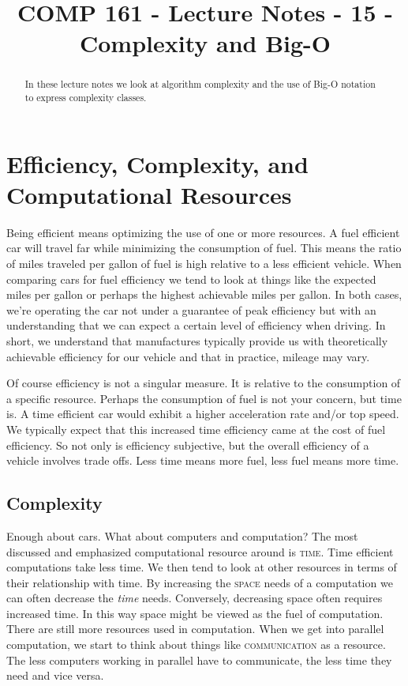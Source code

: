\documentclass[]{tufte-handout}
\title{COMP 161 - Lecture Notes - 15 - Complexity and Big-O}
\date{}
\begin{document}
 
\maketitle

\begin{abstract}
In these lecture notes we look at algorithm complexity and the use of Big-O notation to express complexity classes.
\end{abstract}

\section{Efficiency, Complexity, and Computational Resources}

Being efficient means optimizing the use of one or more resources.  A fuel efficient car will travel far while minimizing the consumption of fuel. This means the ratio of miles traveled per gallon of fuel is high relative to a less efficient vehicle.  When comparing cars for fuel efficiency we tend to look at things like the expected miles per gallon or perhaps the highest achievable miles per gallon. In both cases, we're operating the car not under a guarantee of peak efficiency but with an understanding that we can expect a certain level of efficiency when driving. In short, we understand that manufactures typically provide us with theoretically achievable efficiency for our vehicle and that in practice, mileage may vary. 

Of course efficiency is not a singular measure. It is relative to the consumption of a specific resource.  Perhaps the consumption of fuel is not your concern, but time is.  A time efficient car would exhibit a higher acceleration rate and/or top speed.  We typically expect that this increased time efficiency came at the cost of fuel efficiency. So not only is efficiency subjective, but the overall efficiency of a vehicle involves trade offs.  Less time means more fuel, less fuel means more time. 

\subsection{Complexity}

Enough about cars. What about computers and computation? The most discussed and emphasized computational resource around is \textsc{time}. Time efficient computations take less time.  We then tend to look at other resources in terms of their relationship with time. By increasing the \textsc{space} needs of a computation we can often decrease the \textit{time} needs.  Conversely, decreasing space often requires increased time. In this way space might be viewed as the fuel of computation. There are still more resources used in computation. When we get into parallel computation, we start to think about things like \textsc{communication} as a resource.  The less computers working in parallel have to communicate, the less time they need and vice versa.  
\end{document}
